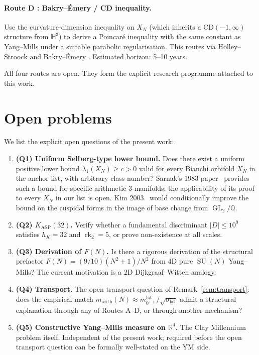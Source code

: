 \documentclass[11pt,a4paper]{article}
\theoremstyle{definition}
\DeclareMathOperator{\rk}{rk}
\DeclareMathOperator{\SU}{SU}
\DeclareMathOperator{\GL}{GL}
\newcommand{\KASP}{K_{\mathrm{ASP}}}
\newcommand{\marith}{m_{\mathrm{arith}}}
\newcommand{\HH}{\mathbb{H}}
\newcommand{\QQ}{\mathbb{Q}}
\newcommand{\RR}{\mathbb{R}}
\begin{document}
\paragraph{Route D : Bakry--\'Emery / CD inequality.}
Use the curvature-dimension inequality on $X_N$ (which inherits a
$\mathrm{CD}(-1, \infty)$ structure from $\HH^3$) to derive a Poincar\'e
inequality with the same constant as Yang--Mills under a suitable
parabolic regularisation. This routes via Holley--Stroock and Bakry--\'Emery
\cite{BakryEmery1985}. Estimated horizon: 5--10 years.

\medskip
\noindent
All four routes are open. They form the explicit research programme attached
to this work.

\section{Open problems}\label{sec:open}

We list the explicit open questions of the present work:

\begin{enumerate}[noitemsep,leftmargin=1.5em]
\item \textbf{(Q1) Uniform Selberg-type lower bound.} Does there exist a
  uniform positive lower bound $\lambda_1(X_N) \geq c > 0$ valid for every
  Bianchi orbifold $X_N$ in the anchor list, with arbitrary class number?
  Sarnak's 1983 paper~\cite{Sarnak1983} provides such a bound for specific
  arithmetic 3-manifolds; the applicability of its proof to every $X_N$
  in our list is open. Kim 2003~\cite{Kim2003} would conditionally improve
  the bound on the cuspidal forms in the image of base change from $\GL_2/\QQ$.
\item \textbf{(Q2) $\KASP(32)$.} Verify whether a fundamental discriminant
  $|D| \leq 10^9$ satisfies $h_K = 32$ and $\rk_2 = 5$, or prove
  non-existence at all scales.
\item \textbf{(Q3) Derivation of $F(N)$.} Is there a rigorous derivation
  of the structural prefactor $F(N) = (9/10)(N^2+1)/N^2$ from $4$D pure
  $\SU(N)$ Yang--Mills? The current motivation is a $2$D Dijkgraaf--Witten
  analogy.
\item \textbf{(Q4) Transport.} The open transport question of
  Remark~\ref{rem:transport}: does the empirical match
  $\marith(N) \approx m_{0^{++}}^{\mathrm{lat}}/\sqrt{\sigma_{\mathrm{lat}}}$
  admit a structural explanation through any of Routes A--D, or through
  another mechanism?
\item \textbf{(Q5) Constructive Yang--Mills measure on $\RR^4$.} The Clay
  Millennium problem itself. Independent of the present work; required
  before the open transport question can be formally well-stated on the
  YM side.
\end{enumerate}
\end{document}
